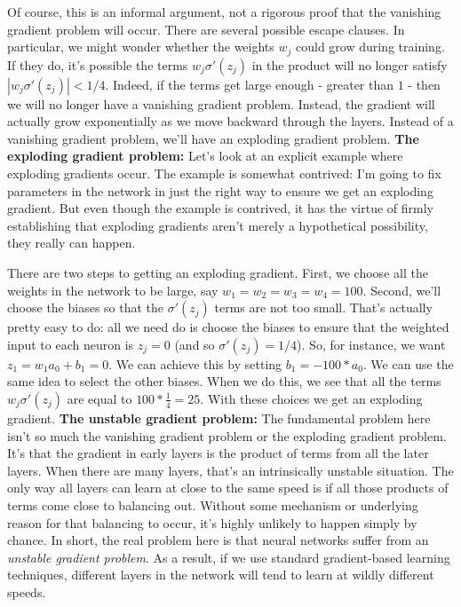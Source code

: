 Of course, this is an informal argument, not a rigorous proof that the vanishing gradient problem will occur. There are several possible escape clauses. In particular, we might wonder whether the weights $w_j$ could grow during training. If they do, it's possible the terms $w_j \sigma'(z_j)$ in the product will no longer satisfy $|w_j \sigma'(z_j)| < 1/4$. Indeed, if the terms get large enough - greater than $1$ - then we will no longer have a vanishing gradient problem. Instead, the gradient will actually grow exponentially as we move backward through the layers. Instead of a vanishing gradient problem, we'll have an exploding gradient problem. \textbf{The exploding gradient problem:} Let's look at an explicit example where exploding gradients occur. The example is somewhat contrived: I'm going to fix parameters in the network in just the right way to ensure we get an exploding gradient. But even though the example is contrived, it has the virtue of firmly establishing that exploding gradients aren't merely a hypothetical possibility, they really can happen.


There are two steps to getting an exploding gradient. First, we choose all the weights in the network to be large, say $w_1 = w_2 = w_3 = w_4 = 100$. Second, we'll choose the biases so that the $\sigma'(z_j)$ terms are not too small. That's actually pretty easy to do: all we need do is choose the biases to ensure that the weighted input to each neuron is $z_j = 0$ (and so $\sigma'(z_j) = 1/4$). So, for instance, we want $z_1 = w_1 a_0 + b_1 = 0$. We can achieve this by setting $b_1 = -100 * a_0$. We can use the same idea to select the other biases. When we do this, we see that all the terms $w_j \sigma'(z_j)$ are equal to $100 * \frac{1}{4} = 25$. With these choices we get an exploding gradient. \textbf{The unstable gradient problem:} The fundamental problem here isn't so much the vanishing gradient problem or the exploding gradient problem. It's that the gradient in early layers is the product of terms from all the later layers. When there are many layers, that's an intrinsically unstable situation. The only way all layers can learn at close to the same speed is if all those products of terms come close to balancing out. Without some mechanism or underlying reason for that balancing to occur, it's highly unlikely to happen simply by chance. In short, the real problem here is that neural networks suffer from an \emph{unstable gradient problem}. As a result, if we use standard gradient-based learning techniques, different layers in the network will tend to learn at wildly different speeds.



